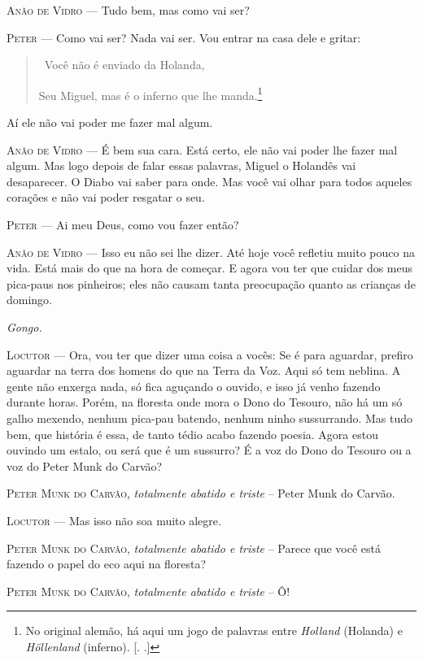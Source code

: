 \begin{myparindent}{0pt}
\begin{Parskip}
\textsc{Anão de Vidro} --- Tudo bem, mas como vai ser?

\textsc{Peter} --- Como vai ser? Nada vai ser. Vou entrar na casa dele e gritar:

\begin{quote}
\quad \, Você não é enviado da Holanda,

Seu Miguel, mas é o inferno que lhe manda.\footnote{No original alemão,
  há aqui um jogo de palavras entre \emph{Holland} (Holanda) e
  \emph{Höllenland} (inferno). [. .]}
\end{quote}

Aí ele não vai poder me fazer mal algum.

\textsc{Anão de Vidro} --- É bem sua cara. Está certo, ele não vai poder lhe fazer
mal algum. Mas logo depois de falar essas palavras, Miguel o Holandês
vai desaparecer. O Diabo vai saber para onde. Mas você vai olhar para
todos aqueles corações e não vai poder resgatar o seu.

\textsc{Peter} --- Ai meu Deus, como vou fazer então?

\textsc{Anão de Vidro} --- Isso eu não sei lhe dizer. Até hoje você refletiu muito
pouco na vida. Está mais do que na hora de começar. E agora vou ter que
cuidar dos meus pica-paus nos pinheiros; eles não causam tanta
preocupação quanto as crianças de domingo.

\emph{Gongo.}

\textsc{Locutor} --- Ora, vou ter que dizer uma coisa a vocês: Se é para aguardar,
prefiro aguardar na terra dos homens do que na Terra da Voz. Aqui só tem
neblina. A gente não enxerga nada, só fica aguçando o ouvido, e isso já
venho fazendo durante horas. Porém, na floresta onde mora o Dono do
Tesouro, não há um só galho mexendo, nenhum pica-pau batendo, nenhum
ninho sussurrando. Mas tudo bem, que história é essa, de tanto tédio
acabo fazendo poesia. Agora estou ouvindo um estalo, ou será que é um
sussurro? É a voz do Dono do Tesouro ou a voz do Peter Munk do Carvão?

\textsc{Peter Munk do Carvão}, \emph{totalmente abatido e triste} -- Peter Munk
do Carvão.

\textsc{Locutor} --- Mas isso não soa muito alegre.

\textsc{Peter Munk do Carvão}, \emph{totalmente abatido e triste} -- Parece que
você está fazendo o papel do eco aqui na floresta?

\textsc{Peter Munk do Carvão}, \emph{totalmente abatido e triste} -- Ô!


\end{Parskip}
\end{myparindent}
